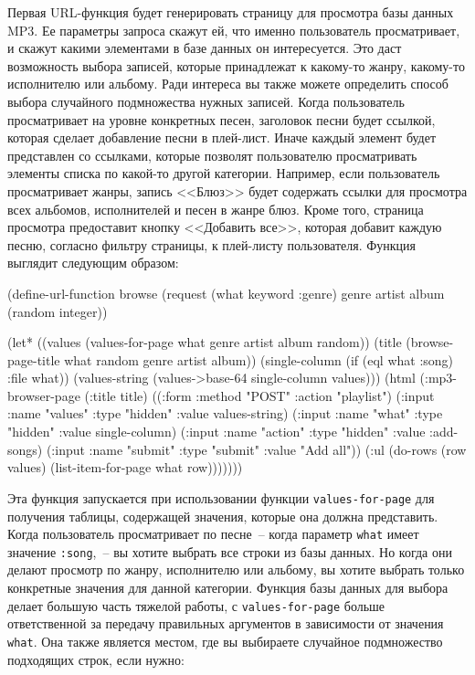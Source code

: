 Первая URL-функция будет генерировать страницу для просмотра базы данных MP3. Ее параметры
запроса скажут ей, что именно пользователь просматривает, и скажут какими элементами в
базе данных он интересуется. Это даст возможность выбора записей, которые принадлежат к
какому-то жанру, какому-то исполнителю или альбому. Ради интереса вы также можете
определить способ выбора случайного под\-мно\-жес\-тва нужных записей. Когда пользователь
просматривает на уровне конкретных песен, заголовок песни будет ссылкой, которая сделает
добавление песни в плей-лист. Иначе каждый элемент будет представлен со ссылками, которые
позволят пользователю просматривать элементы списка по какой-то другой категории.
Например, если пользователь просматривает жанры, запись <<Блюз>> будет содержать ссылки
для просмотра всех альбомов, исполнителей и песен в жанре блюз. Кроме того, страница
просмотра предоставит кнопку <<Добавить все>>, которая добавит каждую песню, согласно
фильтру страницы, к плей-листу пользователя. Функция выглядит следующим образом:

\begin{myverb}
(define-url-function browse
    (request (what keyword :genre) genre artist album (random integer))

  (let* ((values (values-for-page what genre artist album random))
         (title (browse-page-title what random genre artist album))
         (single-column (if (eql what :song) :file what))
         (values-string (values->base-64 single-column values)))
    (html
     (:mp3-browser-page
      (:title title)
      ((:form :method "POST" :action "playlist")
       (:input :name "values" :type "hidden" :value values-string)
       (:input :name "what" :type "hidden" :value single-column)
       (:input :name "action" :type "hidden" :value :add-songs)
       (:input :name "submit" :type "submit" :value "Add all"))
      (:ul (do-rows (row values) (list-item-for-page what row)))))))
\end{myverb}

Эта функция запускается при использовании функции \lstinline{values-for-page} для получения
таблицы, содержащей значения, которые она должна представить. Когда пользователь
просматривает по песне~-- когда параметр \lstinline{what} имеет значение \lstinline{:song},~-- вы
хотите выбрать все строки из базы данных. Но когда они делают просмотр по жанру,
исполнителю или альбому, вы хотите выбрать только конкретные значения для данной
категории. Функция базы данных для выбора делает большую часть тяжелой работы, с
\lstinline{values-for-page} больше ответственной за передачу правильных аргументов в
зависимости от значения \lstinline{what}. Она также является местом, где вы выбираете случайное
подмножество подходящих строк, если нужно:

